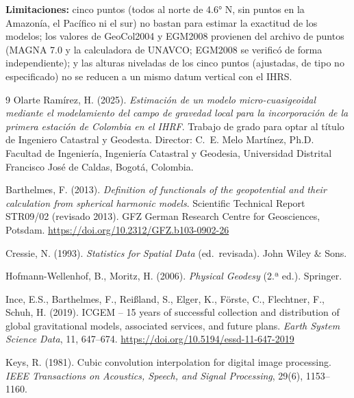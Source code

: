 \documentclass[11pt,letterpaper]{article}
\begin{document}
\vspace{0.3cm}
\textbf{Limitaciones:} cinco puntos (todos al norte de \ang{4.6} N, sin puntos en la Amazonía, el Pacífico
ni el sur) no bastan para estimar la exactitud de los modelos; los valores de GeoCol2004 y EGM2008
provienen del archivo de puntos (MAGNA 7.0 y la calculadora de UNAVCO; EGM2008 se verificó de forma
independiente); y las alturas niveladas de los cinco puntos (ajustadas, de tipo no especificado) no
se reducen a un mismo datum vertical con el IHRS.



\begin{thebibliography}{9}
Olarte Ramírez, H. (2025). \textit{Estimación de un modelo micro-cuasigeoidal mediante el
modelamiento del campo de gravedad local para la incorporación de la primera estación de
Colombia en el IHRF}. Trabajo de grado para optar al título de Ingeniero Catastral y Geodesta.
Director: C.~E. Melo Martínez, Ph.D. Facultad de Ingeniería, Ingeniería Catastral y Geodesia,
Universidad Distrital Francisco José de Caldas, Bogotá, Colombia.

Barthelmes, F. (2013). \textit{Definition of functionals of the geopotential and their
calculation from spherical harmonic models}. Scientific Technical Report STR09/02
(revisado 2013). GFZ German Research Centre for Geosciences, Potsdam.
\url{https://doi.org/10.2312/GFZ.b103-0902-26}

Cressie, N. (1993). \textit{Statistics for Spatial Data} (ed.\ revisada). John Wiley \& Sons.

Hofmann-Wellenhof, B., Moritz, H. (2006). \textit{Physical Geodesy} (2.ª ed.). Springer.

Ince, E.S., Barthelmes, F., Reißland, S., Elger, K., Förste, C., Flechtner, F., Schuh, H.
(2019). ICGEM -- 15 years of successful collection and distribution of global gravitational
models, associated services, and future plans. \textit{Earth System Science Data}, 11,
647--674. \url{https://doi.org/10.5194/essd-11-647-2019}

Keys, R. (1981). Cubic convolution interpolation for digital image processing.
\textit{IEEE Transactions on Acoustics, Speech, and Signal Processing}, 29(6), 1153--1160.


\end{thebibliography}
\end{document}
